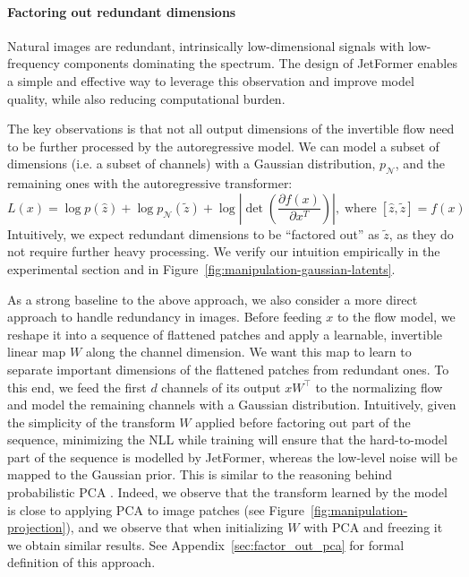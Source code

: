 \documentclass{article} %
\newcommand{\name}{JetFormer\xspace}
\begin{document}
\paragraph{Factoring out redundant dimensions}
Natural images are redundant, intrinsically low-dimensional signals with low-frequency components dominating the spectrum.
The design of \name enables a simple and effective way to leverage this observation and improve model quality, while also reducing computational burden.

The key observations is that not all output dimensions of the invertible flow need to be further processed by the autoregressive model. We can model a subset of dimensions (i.e. a subset of channels) with a Gaussian distribution, $p_\mathcal{N}$, and the remaining ones with the autoregressive transformer:
\begin{equation*}
L(x) = \log p(\hat z) + \log p_\mathcal{N}(\tilde z) + \log \left| \det \left(\frac{\partial f(x)}{\partial x^T}\right)\right|,\;\text{where} \;[\hat z, \tilde z] = f(x)
\end{equation*}
Intuitively, we expect redundant dimensions to be ``factored out'' as $\tilde z$, as they do not require further heavy processing. We verify our intuition empirically in the experimental section and in Figure~\ref{fig:manipulation-gaussian-latents}.

As a strong baseline to the above approach, we also consider a more direct approach to handle redundancy in images.
Before feeding $x$ to the flow model, we reshape it into a sequence of flattened patches and apply a learnable, invertible linear map $W$ along the channel dimension. We want this map to learn to separate important dimensions of the flattened patches from redundant ones. To this end, we feed the first $d$ channels of its output $xW^\top$ to the normalizing flow and model the remaining channels with a Gaussian distribution. Intuitively, given the simplicity of the transform $W$ applied before factoring out part of the sequence, minimizing the NLL while training will ensure that the hard-to-model part of the sequence is modelled by \name, whereas the low-level noise will be mapped to the Gaussian prior. This is similar to the reasoning behind probabilistic PCA \citep{tipping1999probabilistic}.
Indeed, we observe that the transform learned by the model is close to applying PCA to image patches (see Figure~\ref{fig:manipulation-projection}), and we observe that when initializing $W$ with PCA and freezing it we obtain similar results.
See Appendix~\ref{sec:factor_out_pca} for formal definition of this approach.
\end{document}

